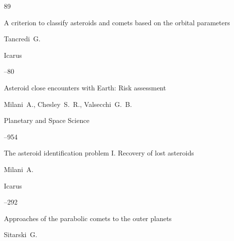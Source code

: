 \newpage





\RusRef



\begin{thebibliography}{89}



\paper A criterion to classify asteroids and comets based on the orbital parameters

\by Tancredi~G.

\jour Icarus



--80






\paper Asteroid close encounters with Earth: Risk assessment

\by Milani~A., Chesley~S.~R., Valsecchi~G.~B.

\jour Planetary and Space Science




–954






\paper The asteroid identification problem I. Recovery of lost asteroids

\by Milani~A.

\jour Icarus




–292






\paper Approaches of the parabolic comets to the outer planets

\by Sitarski~G.


\end{thebibliography}

